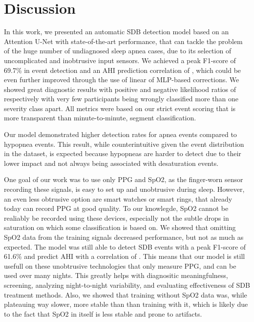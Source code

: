 \chapter{Discussion \label{Chapter-Discussion}}


In this work, we presented an automatic SDB detection model based on an Attention U-Net with state-of-the-art performance, that can tackle the problem of the huge number of undiagnosed sleep apnea cases, due to its selection of uncomplicated and inobtrusive input sensors. We achieved a peak F1-score of 69.7\% in event detection and an AHI prediction correlation of , which could be even further improved through the use of linear of MLP-based corrections. We showed great diagnostic results with positive and negative likelihood ratios of  respectively with very few participants being wrongly classified more than one severity class apart. All metrics were based on our strict event scoring that is more transparent than minute-to-minute, segment classification.

Our model demonstrated higher detection rates for apnea events compared to hypopnea events. This result, while counterintuitive given the event distribution in the dataset, is expected because hypopneas are harder to detect due to their lower impact and not always being associated with desaturation events.

One goal of our work was to use only PPG and SpO2, as the finger-worn sensor recording these signals, is easy to set up and unobtrusive during sleep. However, an even less obtrusive option are smart watches or smart rings, that already today can record PPG at good quality. To our knowlegde, SpO2 cannot be realiably be recorded using these devices, especially not the subtle drops in saturation on which some classification is based on. 
We showed that omitting SpO2 data from the training signals decreased performance, but not as much as expected. The model was still able to detect SDB events with a peak F1-score of 61.6\% and predict AHI with a correlation of . This means that our model is still usefull on these unobtrusive technologies that only measure PPG, and can be used over many nights. This greatly helps with diagnositic meaningfulness, screening, analyzing night-to-night variability, and evaluating effectiveness of SDB treatment methods.
Also, we showed that training without SpO2 data was, while plateauing way slower, more stable than than training with it, which is likely due to the fact that SpO2 in itself is less stable and prone to artifacts. 

